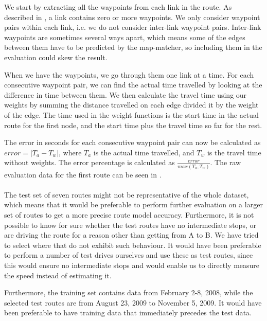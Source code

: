 We start by extracting all the waypoints from each link in the route. As described in , a link contains zero or more waypoints. We only consider waypoint pairs within each link, i.e. we do not consider inter-link waypoint pairs. Inter-link waypoints are sometimes several ways apart, which means some of the edges between them have to be predicted by the map-matcher, so including them in the evaluation could skew the result.

When we have the waypoints, we go through them one link at a time. For each consecutive waypoint pair, we can find the actual time travelled by looking at the difference in time between them. We then calculate the travel time using our weights by summing the distance travelled on each edge divided it by the weight of the edge. The time used in the weight functions is the start time in the actual route for the first node, and the start time plus the travel time so far for the rest.

The error in seconds for each consecutive waypoint pair can now be calculated as $error = |T_a - T_w|$, where $T_a$ is the actual time travelled, and $T_w$ is the travel time without weights. The error percentage is calculated as $\frac{error}{max(T_a, T_w)}$. The raw evaluation data for the first route can be seen in .
\\\\
The test set of seven routes might not be representative of the whole dataset, which means that it would be preferable to perform further evaluation on a larger set of routes to get a more precise route model accuracy. Furthermore, it is not possible to know for sure whether the test routes have no intermediate stops, or are driving the route for a reason other than getting from A to B. We have tried to select where that do not exhibit such behaviour. It would have been preferable to perform a number of test drives ourselves and use these as test routes, since this would ensure no intermediate stops and would enable us to directly measure the speed instead of estimating it.

Furthermore, the training set contains data from February 2-8, 2008, while the selected test routes are from August 23, 2009 to November 5, 2009. It would have been preferable to have training data that immediately precedes the test data.
